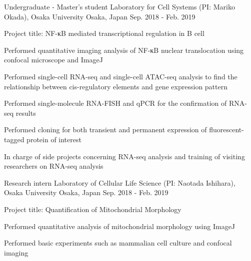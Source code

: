 

\begin{cventries}

  \cventry
  {Undergraduate - Master's student} %
  {Laboratory for Cell Systems (PI: Mariko Okada), Osaka University} %
  {Osaka, Japan} %
  {Sep. 2018 - Feb. 2019} %
  {
    \begin{cvitems} %
      \item {Project title: NF-κB mediated transcriptional regulation in B cell}
      \item {Performed quantitative imaging analysis of NF-κB nuclear translocation using confocal microscope and ImageJ}
      \item {Performed single-cell RNA-seq and single-cell ATAC-seq analysis to find the relationship between cis-regulatory elements and gene expression pattern}
      \item {Performed single-molecule RNA-FISH and qPCR for the confirmation of RNA-seq results}
      \item {Performed cloning for both transient and permanent expression of fluorescent-tagged protein of interest}
      \item {In charge of side projects concerning RNA-seq analysis and training of visiting researchers on RNA-seq analysis}
    \end{cvitems}
  }

  \cventry
  {Research intern} %
  {Laboratory of Cellular Life Science (PI: Naotada Ishihara), Osaka University} %
  {Osaka, Japan} %
  {Sep. 2018 - Feb. 2019} %
  {
    \begin{cvitems} %
      \item {Project title: Quantification of Mitochondrial Morphology}
      \item {Performed quantitative analysis of mitochondrial morphology using ImageJ}
      \item {Performed basic experiments such as mammalian cell culture and confocal imaging}
    \end{cvitems}
  }


\end{cventries}
